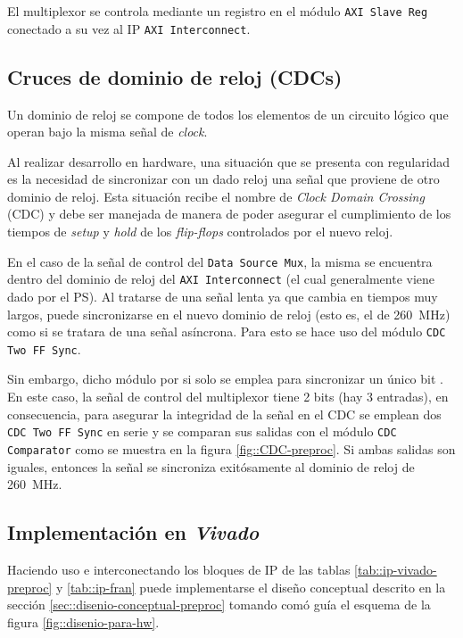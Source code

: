 \documentclass[../../main.tex]{subfiles}
\begin{document}
El multiplexor se controla mediante un registro en el módulo \texttt{AXI Slave Reg} conectado a su vez al IP \texttt{AXI Interconnect}.

\subsection{Cruces de dominio de reloj (CDCs)}\label{subsec::cdcs-standalone}
Un dominio de reloj se compone de todos los elementos de un circuito lógico que operan bajo la misma señal de \textit{clock}.

Al realizar desarrollo en hardware, una situación que se presenta con regularidad es la necesidad de sincronizar con un dado reloj una señal que proviene de otro dominio de reloj. Esta situación recibe el nombre de \textit{Clock Domain Crossing} (CDC) y debe ser manejada de manera de poder asegurar el cumplimiento de los tiempos de \textit{setup} y \textit{hold} de los \textit{flip-flops} controlados por el nuevo reloj.

En el caso de la señal de control del \texttt{Data Source Mux}, la misma se encuentra dentro del dominio de reloj del \texttt{AXI Interconnect} (el cual generalmente viene dado por el PS). Al tratarse de una señal lenta ya que cambia en tiempos muy largos, puede sincronizarse en el nuevo dominio de reloj (esto es, el de 260~MHz) como si se tratara de una señal asíncrona. Para esto se hace uso del módulo \texttt{CDC Two FF Sync}.

Sin embargo, dicho módulo por si solo se emplea para sincronizar un único bit . En este caso, la señal de control del multiplexor tiene 2 bits (hay 3 entradas), en consecuencia, para asegurar la integridad de la señal en el CDC se emplean dos \texttt{CDC Two FF Sync} en serie y se comparan sus salidas con el módulo \texttt{CDC Comparator} como se muestra en la figura \ref{fig::CDC-preproc}. Si ambas salidas son iguales, entonces la señal se sincroniza exitósamente al dominio de reloj de 260~MHz.


\subsection{Implementación en \textit{Vivado}}
Haciendo uso e interconectando los bloques de IP de las tablas \ref{tab::ip-vivado-preproc} y \ref{tab::ip-fran} puede implementarse el diseño conceptual descrito en la sección \ref{sec::disenio-conceptual-preproc} tomando comó guía el esquema de la figura \ref{fig::disenio-para-hw}. 
\end{document}
